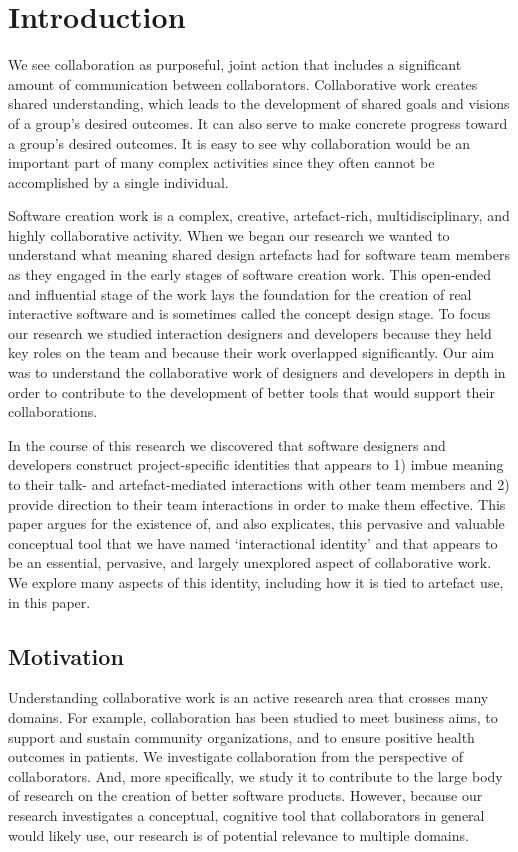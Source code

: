 \documentclass{chi2009}
\begin{document}
\section{Introduction}

We see collaboration as purposeful, joint action that includes a significant amount of communication between collaborators.  Collaborative work creates shared understanding, which leads to the development of shared goals and visions of a group's desired outcomes. It can also serve to make concrete progress toward a group's desired outcomes.  It is easy to see why collaboration would be an important part of many complex activities since they often cannot be accomplished by a single individual.  

Software creation work is a complex, creative, artefact-rich, multidisciplinary, and highly collaborative activity. When we began our research we wanted to understand what meaning shared design artefacts had for software team members as they engaged in the early stages of software creation work. This open-ended and influential stage of the work lays the foundation for the creation of real interactive software and is sometimes called the concept design stage. To focus our research we studied interaction designers and developers because they held key roles on the team and because their work overlapped significantly.  Our aim was to understand the collaborative work of designers and developers in depth in order to contribute to the development of better tools that would support their collaborations.  

In the course of this research we discovered that software designers and developers construct project-specific identities that appears to 1) imbue meaning to their talk- and artefact-mediated interactions with other team members and 2) provide direction to their team interactions in order to make them effective.  This paper argues for the existence of, and also explicates, this pervasive and valuable conceptual tool that we have named `interactional identity' and that appears to be an essential, pervasive, and largely unexplored aspect of collaborative work. We explore many aspects of this identity, including how it is tied to artefact use, in this paper. 

\subsection{Motivation} 

Understanding collaborative work is an active research area that crosses many domains.  For example, collaboration has been studied to meet business aims, to support and sustain community organizations, and to ensure positive health outcomes in patients.  We investigate collaboration from the perspective of collaborators. And, more specifically, we study it to contribute to the large body of research on the creation of better software products. However, because our research investigates a conceptual, cognitive tool that collaborators in general would likely use, our research is of potential relevance to multiple domains.  
\end{document}
